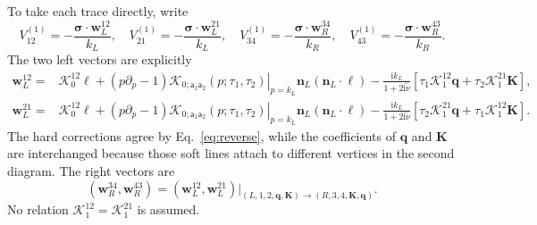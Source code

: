 \documentclass[a4paper,12pt]{article}
\newcommand{\ii}{\mathrm i}
\newcommand{\mb}{\mathbf}
\newcommand{\tn}{\tilde\nu}
\def\aa{\mathsf a}
\newcommand{\bq}{\mb q}
\newcommand{\bs}{\bm\sigma}
\begin{document}
To take each trace directly, write
\begin{equation}
 V_{12}^{(1)}=-\frac{\bs\cdot\mb w_L^{12}}{k_L},\quad
 V_{21}^{(1)}=-\frac{\bs\cdot\mb w_L^{21}}{k_L},\quad
 V_{34}^{(1)}=-\frac{\bs\cdot\mb w_R^{34}}{k_R},\quad
 V_{43}^{(1)}=-\frac{\bs\cdot\mb w_R^{43}}{k_R}.
 \label{eq:direct-first-order-vectors}
\end{equation}
The two left vectors are explicitly
\begin{align}
 \mb w_L^{12}
 ={}&\mathcal K_0^{12}\bm\ell+
 \left.(p\partial_p-1)\mathcal K_{0;\aa_1\aa_2}(p;\tau_1,\tau_2)\right|_{p=k_L}
 \mb n_L(\mb n_L\cdot\bm\ell)
 -\frac{\ii k_L}{1+2\ii\tn}
 [\tau_1\mathcal K_1^{12}\bq+\tau_2\mathcal K_1^{21}\mb K],
 \nonumber\\
 \mb w_L^{21}
 ={}&\mathcal K_0^{12}\bm\ell+
 \left.(p\partial_p-1)\mathcal K_{0;\aa_1\aa_2}(p;\tau_1,\tau_2)\right|_{p=k_L}
 \mb n_L(\mb n_L\cdot\bm\ell)
 -\frac{\ii k_L}{1+2\ii\tn}
 [\tau_2\mathcal K_1^{21}\bq+\tau_1\mathcal K_1^{12}\mb K].
 \label{eq:two-direct-left-vectors}
\end{align}
The hard corrections agree by Eq.~\eqref{eq:reverse}, while the
coefficients of $\bq$ and $\mb K$ are interchanged because those
soft lines attach to different vertices in the second diagram.
The right vectors are
\begin{equation}
 (\mb w_R^{34},\mb w_R^{43})
 =(\mb w_L^{12},\mb w_L^{21})
 \big|_{(L,1,2,\bq,\mb K)\to(R,3,4,\mb K,\bq)}.
 \label{eq:two-direct-right-vectors}
\end{equation}
No relation $\mathcal K_1^{12}=\mathcal K_1^{21}$ is assumed.
\end{document}
